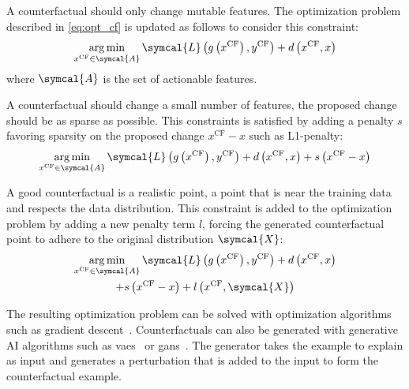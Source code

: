 \documentclass[../main.tex]{subfiles}
\begin{document}
	\begin{description}[
			style=multiline,
			leftmargin=!,
			labelwidth=3cm,
		]
		\item[Actionnability\label{item:cf_actionability}]
			A counterfactual should only change mutable features.
			The optimization problem described in \cref{eq:opt_cf} is updated as follows to consider this constraint:
			\[\argmin_{x^{\text{CF}} \in \symcal{A}} \symcal{L}\left(g\left(x^{\text{CF}}\right), y^{\text{CF}} \right) + d\left(x^{\text{CF}}, x\right)\]
			where \(\symcal{A}\) is the set of actionable features.
		\item[Sparsity\label{item:cf_sparse}]
			A counterfactual should change a small number of features, \ie{}the proposed change should be as sparse as possible.
			This constraints is satisfied by adding a penalty \(s\) favoring sparsity on the proposed change \(x^{\text{CF}} - x\) such as L1-penalty:
			\begin{equation*}
				\argmin_{x^{\text{CF}} \in \symcal{A}} \symcal{L}\left(g\left(x^{\text{CF}}\right), y^{\text{CF}} \right) + d\left(x^{\text{CF}}, x\right) + s\left(x^{\text{CF}}-x\right)
			\end{equation*}
		\item[Data manifold closeness\label{item:cf_data_manifold}]
			A good counterfactual is a realistic point, a point that is near the training data and respects the data distribution.
			This constraint is added to the optimization problem by adding a new penalty term \(l\), forcing the generated counterfactual point to adhere to the original distribution \(\symcal{X}\):
			\begin{multline*}
				\argmin_{x^{\text{CF}} \in \symcal{A}} \symcal{L}\left(g\left(x^{\text{CF}}\right), y^{\text{CF}} \right) + d\left(x^{\text{CF}}, x\right)\\ + s\left(x^{\text{CF}}-x\right) + l\left(x^{\text{CF}}, \symcal{X}\right)
			\end{multline*}
	\end{description}
	The resulting optimization problem can be solved with optimization algorithms such as gradient descent~\cite{wachter2017counterfactual}.
	Counterfactuals can also be generated with generative AI algorithms such as \glspl{vae}~\cite{mahajan2020preservingcausalconstraintscounterfactual} or \glspl{gan}~\cite{CounteRGAN,vanlooveren2021conditionalgenerativemodelscounterfactual,Yang2021ModelBasedCS}.
	The generator takes the example to explain as input and generates a perturbation that is added to the input to form the counterfactual example.
\end{document}
